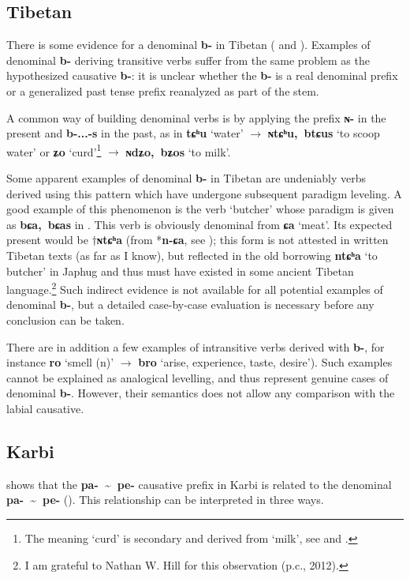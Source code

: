 \documentclass[oneside,a4paper,11pt]{article}
\newcommand{\ipa}[1]{\textbf{{\phon\mbox{#1}}}} %
\newcommand{\forme}[2]{\ipa{#1} `#2'}
\newcommand{\tld}{\textasciitilde{}}
\begin{document}
\subsection{Tibetan} \label{sec:tib.denom}
There is some evidence for a denominal \ipa{b-} in Tibetan (\citealt[100]{mazo04st} and \citealt[250-1]{zhang09cizu}). Examples of denominal \ipa{b-} deriving transitive verbs suffer from the same problem as the hypothesized causative \ipa{b-}: it is unclear whether the \ipa{b-} is a real denominal prefix or a generalized past tense prefix reanalyzed as part of the stem.

A common way of building denominal verbs is by applying the prefix \ipa{ɴ-} in the present and \ipa{b-...-s} in the past, as in \forme{tɕʰu}{water} $\rightarrow$ \forme{ɴtɕʰu, btɕus}{to scoop water} or \forme{ʑo}{curd}\footnote{The meaning `curd' is secondary and derived from `milk', see \citet[29-30]{jacques14esquisse} and \citet{tournadre15chocha}.} $\rightarrow$ \forme{ɴdʑo, bʑos}{to milk}.

Some apparent examples of denominal \ipa{b-} in Tibetan are undeniably verbs derived using this pattern which have undergone subsequent paradigm leveling. A good example of this phenomenon is the verb `butcher' whose paradigm is given as \ipa{bɕa, bɕas} in \citet{bodrgya}. This verb is obviously denominal from \forme{ɕa}{meat}. Its expected present would be $\dagger$\ipa{ɴtɕʰa} (from *\ipa{n-ɕa}, see \citealt{lifk33}); this form is not attested in written Tibetan texts (as far as I know), but reflected in the old borrowing \forme{ntɕʰa}{to butcher} in Japhug and thus must have existed in some ancient Tibetan language.\footnote{I am grateful to Nathan W. Hill for this observation (p.c., 2012).} Such indirect evidence is not available for all potential examples of denominal \ipa{b-}, but a detailed case-by-case evaluation is necessary before any conclusion can be taken.

There are in addition a few examples of intransitive verbs derived with \ipa{b-}, for  instance \forme{ro}{smell (n)} $\rightarrow$ \forme{bro}{arise, experience, taste, desire}). Such examples cannot be explained as analogical levelling, and thus represent genuine cases of denominal \ipa{b-}. However, their semantics does not allow any comparison with the labial causative.


\subsection{Karbi} \label{sec:karbi.denom}
\citet[238]{konnerth14karbi} shows that the  \ipa{pa- \tld{} pe-} causative prefix in Karbi is related to the denominal  \ipa{pa- \tld{} pe-} (\citealt[205]{konnerth14karbi}). This relationship can be interpreted in three ways. 
\end{document}
